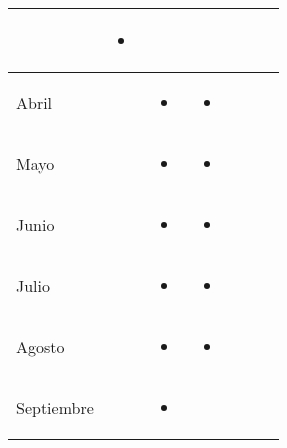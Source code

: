 \documentclass[landscape, a4paper, 10pt]{article}
\newcommand{\smallcellwidth}{0.7in}
\newcommand{\normalcellwidth}{1.2in}
\newcommand{\bigcellwidth}{2.0in}
\begin{document}
\begin{longtable}{|m{\smallcellwidth}|p{\normalcellwidth}|p{\bigcellwidth}|p{\bigcellwidth}|p{\normalcellwidth}|p{\normalcellwidth}|p{\normalcellwidth}|}
\begin{itemize}
		\end{itemize} &
		\begin{itemize}
			\item 
		\end{itemize} &
		 &
		 &
		 \\
		\hline
		Abril &
		 &
		\begin{itemize}
			\item 
		\end{itemize} &
		\begin{itemize}
			\item 
 		\end{itemize} &
 		 &
		 &
		 \\
		\hline
		Mayo &
		 &
		\begin{itemize}
			\item 
		\end{itemize} &
		\begin{itemize}
			\item 
 		\end{itemize} &
		 &
		 &
		 \\
		\hline
		Junio &
		 &
		\begin{itemize}
			\item 
		\end{itemize} &
		\begin{itemize}
			\item 
 		\end{itemize} &
		 &
		 &
		 \\
		\hline
		Julio &
		 &
		\begin{itemize}
			\item 
		\end{itemize} &
		\begin{itemize}
			\item 
 		\end{itemize} &
		 &
		 &
		 \\
		\hline
		Agosto &
		 &
		\begin{itemize}
			\item 
		\end{itemize} &
		\begin{itemize}
			\item 
 		\end{itemize} &
		 &
		 &
		 \\
		\hline
		Septiembre &
		 &
		\begin{itemize}
			\item 

\end{itemize}
\end{longtable}
\end{document}
